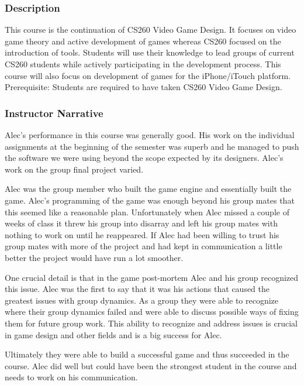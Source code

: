 
\subsubsection*{Description}
This course is the continuation of CS260 Video Game Design. It focuses
on video game theory and active development of games whereas CS260
focused on the introduction of tools. Students will use their knowledge
to lead groups of current CS260 students while actively participating
in the development process. This course will also focus on development
of games for the iPhone/iTouch platform. Prerequisite: Students are
required to have taken CS260 Video Game Design.

\subsubsection*{Instructor Narrative}
Alec's performance in this course was generally good. His work on the
individual assignments at the beginning of the semester was superb and
he managed to push the software we were using beyond the scope expected
by its designers. Alec's work on the group final project varied.

Alec was the group member who built the game engine and essentially
built the game. Alec's programming of the game was enough beyond his
group mates that this seemed like a reasonable plan. Unfortunately when
Alec missed a couple of weeks of class it threw his group into disarray
and left his group mates with nothing to work on until he reappeared. If
Alec had been willing to trust his group mates with more of the project
and had kept in communication a little better the project would have run
a lot smoother.

One crucial detail is that in the game post-mortem Alec and his group
recognized this issue. Alec was the first to say that it was his actions
that caused the greatest issues with group dynamics. As a group they
were able to recognize where their group dynamics failed and were able
to discuss possible ways of fixing them for future group work. This
ability to recognize and address issues is crucial in game design and
other fields and is a big success for Alec.

Ultimately they were able to build a successful game and thus succeeded
in the course. Alec did well but could have been the strongest student
in the course and needs to work on his communication.
